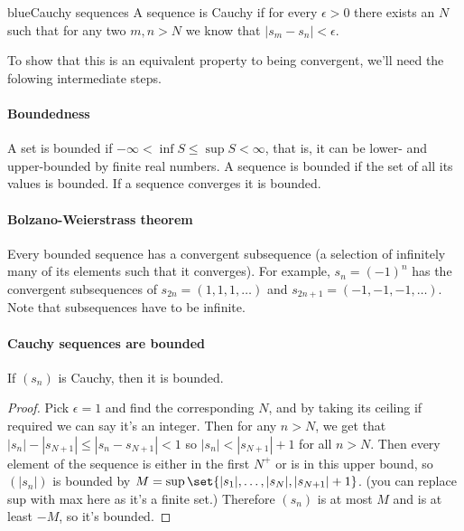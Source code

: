 \documentclass[./analysis.tex]{subfiles}
\begin{document}
    \begin{mycolorbox}{blue}{Cauchy sequences} A sequence is Cauchy if for every $\epsilon > 0$ there exists an $N$ such that for any two $m, n > N$ we know that $|s_m - s_n| < \epsilon$. \end{mycolorbox}

    To show that this is an equivalent property to being convergent, we'll need the folowing intermediate steps.



    \paragraph*{Boundedness} A set is bounded if $-\infty < \inf S \leq \sup S < \infty$, that is, it can be lower- and upper-bounded by finite real numbers. A sequence is bounded if the set of all its values is bounded. If a sequence converges it is bounded.

    \paragraph*{Bolzano-Weierstrass theorem} Every bounded sequence has a convergent subsequence (a selection of infinitely many of its elements such that it converges). For example, $s_n = (-1)^n$ has the convergent subsequences of $s_{2n} = (1, 1, 1, \dots)$ and $s_{2n+1} = (-1, -1, -1, \dots)$. Note that subsequences have to be infinite.

    \paragraph*{Cauchy sequences are bounded} If $(s_n)$ is Cauchy, then it is bounded.

    \begin{proof}
        Pick $\epsilon = 1$ and find the corresponding $N$, and by taking its ceiling if required we can say it's an integer. Then for any $n > N$, we get that $|s_n| - |s_{N + 1}| \leq |s_n - s_{N + 1}| < 1$ so $|s_n| < |s_{N + 1}| + 1$ for all $n > N$. Then every element of the sequence is either in the first $N^+$ or is in this upper bound, so $(|s_n|)$ is bounded by $M = \sup\set{|s_1|, \dots, |s_{N}|, |s_{N + 1}| + 1}$. (you can replace sup with max here as it's a finite set.) Therefore $(s_n)$ is at most $M$ and is at least $-M$, so it's bounded.
    \end{proof}
    
\end{document}
